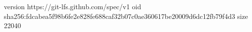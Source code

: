 version https://git-lfs.github.com/spec/v1
oid sha256:fdcabea5f98b6fe2e828fe688caf32b07c0ae360617be20009d6dc12fb79f4d3
size 22040
